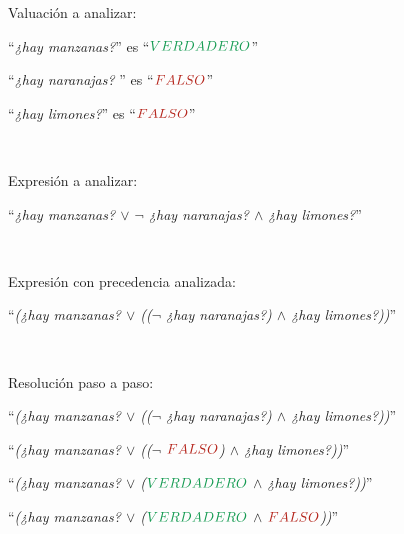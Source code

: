 \begin{example}
    \sindent Valuación a analizar:

    \dindent ``\textit{¿hay manzanas?}'' es ``$\ltruefull$''

    \dindent ``\textit{¿hay naranajas?} '' es ``$\lfalsefull$''

    \dindent ``\textit{¿hay limones?}'' es ``$\lfalsefull$''

    ~

    \sindent Expresión a analizar:

    \dindent ``\textit{¿hay manzanas? $\lor$ $\lnot$ ¿hay naranajas? $\land$
    ¿hay limones?}''

    ~

    \sindent Expresión con precedencia analizada:

    \dindent ``\textit{(¿hay manzanas? $\lor$ (($\lnot$ ¿hay naranajas?) $\land$
    ¿hay limones?))}''

    ~

    \sindent Resolución paso a paso:

    \dindent ``\textit{(¿hay manzanas? $\lor$ (($\lnot$ ¿hay naranajas?) $\land$
    ¿hay limones?))}''

    \dindent {}

    \dindent ``\textit{(¿hay manzanas? $\lor$ (($\lnot$ $\lfalsefull$) $\land$
    ¿hay limones?))}''

    \dindent {}

    \dindent ``\textit{(¿hay manzanas? $\lor$ ($\ltruefull$ $\land$ ¿hay
    limones?))}''

    \dindent {}

    \dindent ``\textit{(¿hay manzanas? $\lor$ ($\ltruefull$ $\land$
    $\lfalsefull$))}''

    \dindent {}

    \dindent {}


\end{example}
